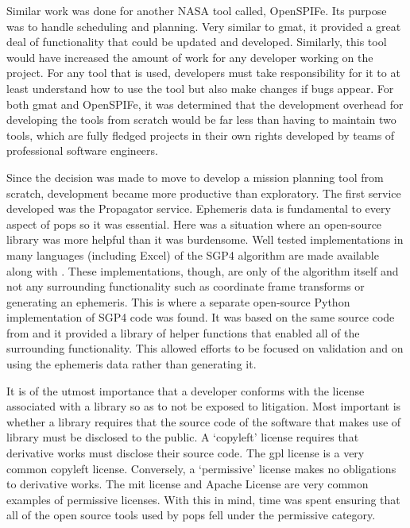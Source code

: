 
Similar work was done for another NASA tool called, OpenSPIFe. Its purpose was
to handle scheduling and planning. Very similar to \gls{gmat}, it provided a
great deal of functionality that could be updated and developed. Similarly,
this tool would have increased the amount of work for any developer working on
the project. For any tool that is used, developers must take responsibility for
it to at least understand how to use the tool but also make changes if bugs
appear. For both \gls{gmat} and OpenSPIFe, it was determined that the
development overhead for developing the tools from scratch would be far less
than having to maintain two tools, which are fully fledged projects in their
own rights developed by teams of professional software engineers.

Since the decision was made to move to develop a mission planning tool from
scratch, development became more productive than exploratory. The first service
developed was the Propagator service. Ephemeris data is fundamental to every
aspect of \gls{pops} so it was essential. Here was a situation where an
open-source library was more helpful than it was burdensome. Well tested
implementations in many languages (including Excel) of the SGP4 algorithm are
made available along with \cite{vallado_revisiting_2006}. These
implementations, though, are only of the algorithm itself and not any
surrounding functionality such as coordinate frame transforms or generating an
ephemeris. This is where a separate open-source Python implementation of SGP4
code was found. It was based on the same source code from
\cite{vallado_revisiting_2006} and it provided a library of helper functions
that enabled all of the surrounding functionality.  This allowed efforts to be
focused on validation and on using the ephemeris data rather than generating
it.

It is of the utmost importance that a developer conforms with the license
associated with a library so as to not be exposed to litigation. Most important
is whether a library requires that the source code of the software that makes
use of library must be disclosed to the public. A `copyleft' license requires
that derivative works must disclose their source code. The \gls{gpl} license is
a very common copyleft license.  Conversely, a `permissive' license makes no
obligations to derivative works. The \gls{mit} license and Apache License are
very common examples of permissive licenses.  With this in mind, time was spent
ensuring that all of the open source tools used by \gls{pops} fell under the
permissive category.  

